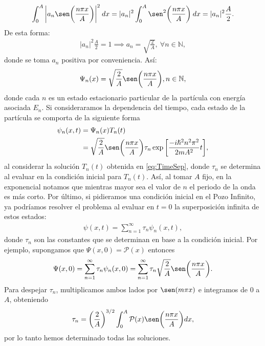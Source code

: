 \documentclass[12pt]{article}
\theoremstyle{definition}
\newcommand*{\field}[1]{\mathbb{#1}}
\begin{document}
\begin{align*}
    \int_{0}^{A} \bigg|a_{n}\sen\bigg(\frac{n\pi x}{A}\bigg)\bigg| ^2\:dx = |a_{n}|^2 \int_{0}^{A} \sen^2\bigg(\frac{n\pi x}{A}\bigg)\:dx = |a_{n}|^2\frac{A}{2}.
\end{align*}
De esta forma:
\begin{align*}
    |a_{n}|^2\frac{A}{2} = 1 \implies a_{n} = \sqrt{\frac{2}{A}},\:\forall n \in \field{N},
\end{align*}
donde se toma $a_{n}$ positiva por conveniencia. Así:
\begin{align}
    \Psi_{n}(x) = \sqrt{\frac{2}{A}}\sen\bigg(\frac{n\pi x}{A}\bigg), n \in \field{N},
    \label{eq:PsiPI}
\end{align}
donde cada $n$ es un estado estacionario particular de la partícula con energía asociada $E_{n}$. Si consideraramos la dependencia del tiempo, cada estado de la partícula se comporta de la siguiente forma
\begin{align*}
    \psi_{n}(x,t) & = \Psi_{n}(x)T_{n}(t) \\
    & = \sqrt{\frac{2}{A}}\sen\bigg(\frac{n\pi x}{A}\bigg)\tau_{n}\exp\bigg[
    \frac{-i\hslash^2n^2\pi^2}{2mA^2}t
    \bigg],
\end{align*}
 al considerar la solución $T_{n}(t)$ obtenida en \eqref{eq:TimeSep}, donde $\tau_{n}$ se determina al evaluar en la condición inicial para $T_{n}(t)$. Así, al tomar $A$ fijo, en la exponencial notamos que mientras mayor sea el valor de $n$ el periodo de la onda es más corto. Por último, si pidieramos una condición inicial en el Pozo Infinito, ya podríamos resolver el problema al evaluar en $t=0$ la superposición infinita de estos estados:
 \begin{align*}
     \psi(x,t) = \sum_{n=1}^{\infty}\tau_{n} \psi_{n}(x,t),
 \end{align*}
 donde $\tau_{n}$ son las constantes que se determinan en base a la condición inicial. Por ejemplo, supongamos que $\Psi(x,0) = \mathcal{P}(x)$ entonces
 \begin{align*}
      \Psi(x,0) = \sum_{n=1}^{\infty}\tau_{n} \psi_{n}(x,0) = \sum_{n=1}^{\infty}\tau_{n}\sqrt{\frac{2}{A}}\sen\bigg(\frac{n\pi x}{A}\bigg).
 \end{align*}
 Para despejar $\tau_{n}$, multiplicamos ambos lados por $\sen(m\pi x)$ e integramos de $0$ a $A$, obteniendo
 \begin{align*}
     \tau_{n} = \bigg(\frac{2}{A}\bigg)^{3/2}\int_{0}^{A}\mathcal{P}(x)\sen\bigg(\frac{n\pi x}{A}\bigg)dx,
 \end{align*}
 por lo tanto hemos determinado todas las soluciones.
\end{document}
